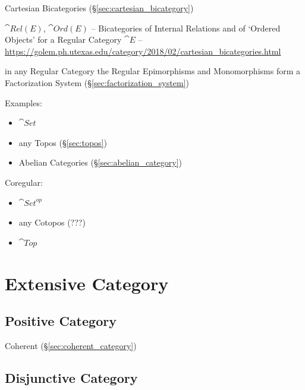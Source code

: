Cartesian Bicategories (\S\ref{sec:cartesian_bicategory})

$\cat{Rel(E)}$, $\cat{Ord(E)}$ -- Bicategories of Internal Relations and of
`Ordered Objects' for a Regular Category $\cat{E}$
--\url{https://golem.ph.utexas.edu/category/2018/02/cartesian_bicategories.html}

in any Regular Category the Regular Epimorphisms and Monomorphisms
form a Factorization System (\S\ref{sec:factorization_system})

Examples:

\begin{itemize}
  \item $\cat{Set}$
  \item any Topos (\S\ref{sec:topos})
  \item Abelian Categories (\S\ref{sec:abelian_category})
\end{itemize}

Coregular:

\begin{itemize}
  \item $\cat{Set}^{op}$
  \item any Cotopos (???)
  \item $\cat{Top}$
\end{itemize}



\section{Extensive Category}\label{sec:extensive_category}

\subsection{Positive Category}\label{sec:positive_category}

Coherent (\S\ref{sec:coherent_category})



\subsection{Disjunctive Category}\label{sec:disjunctive_category}

